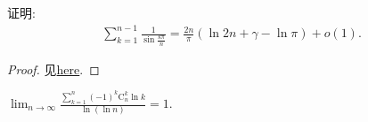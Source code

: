 \documentclass[../../main.tex]{subfiles}%
\begin{document}
\begin{example}
证明:
\begin{align*}
\sum\limits_{k=1}^{n-1}{\frac{1}{\sin \frac{k\pi}{n}}}=\frac{2n}{\pi}\left( \ln 2n+\gamma -\ln \pi \right) +o\left( 1 \right).
\end{align*}
\end{example}
\begin{proof}

见\href{https://math.stackexchange.com/questions/3216414/sum-of-reciprocal-sine-function-sum-limits-k-1n-1-frac1-sin-frack-p?noredirect=1}{here}.

\end{proof}

\begin{example}
$\lim_{n\rightarrow \infty} \frac{\sum\limits_{k=1}^n{\left( -1 \right) ^k\mathrm{C}_{n}^{k}\ln k}}{\ln \left( \ln n \right)}=1.$
\end{example}
\end{document}
